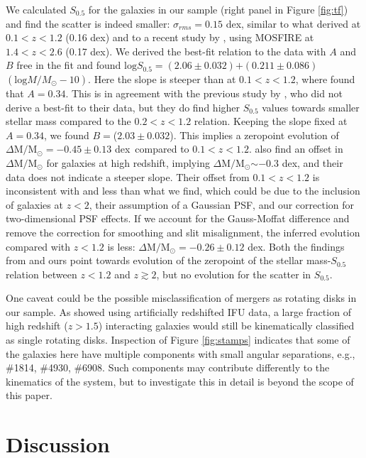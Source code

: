 \documentclass{emulateapj}
\newcommand{\msun}{$\mathrm{M_{\odot}}$}
\newcommand{\bsfree}{$(2.06\pm0.032)$}
\newcommand{\asfree}{$(0.211\pm0.086)$}
\newcommand{\bsfix}{($2.03\pm0.032$)}
\newcommand{\sev}{$\Delta \mathrm{M}/$\msun$=-0.45\pm0.13$ dex}
\newcommand{\sevnoc}{$\Delta \mathrm{M}/$\msun$=-0.26\pm0.12$ dex}
\begin{document}
{We calculated $S_{0.5}$ for the galaxies in our sample (right panel in Figure \ref{fig:tf}) and find the scatter is indeed smaller: {$\sigma_{rms}=0.15$} dex{, similar to what \citet{Kassin07} derived at $0.1<z<1.2$ (0.16 dex) and to a recent study by \citet{Price15}, using MOSFIRE at $1.4<z<2.6$ (0.17 dex)}. We derived the best-fit relation to the data with $A$ and $B$ free in the fit and found $\mathrm{log}S_{0.5}=$\bsfree$+$\asfree$(\mathrm{log}M/M_{\odot}-10)$. Here the slope is steeper than at $0.1<z<1.2$, where \citet{Kassin07} found that $A=0.34$. This is in agreement with the previous study by \citet{Cresci09}, who did not derive a best-fit to their data, but they do find higher $S_{0.5}$ values towards smaller stellar mass compared to the $0.2<z<1.2$ relation. Keeping the slope fixed at $A=0.34$, we found $B=$\bsfix. This implies a zeropoint evolution of \sev\ compared to $0.1<z<1.2$. \citet{Price15} also find an offset {in $\Delta \mathrm{M}/$\msun} for galaxies at high redshift, implying $\Delta \mathrm{M}/$\msun$\sim-0.3$ dex, and their data does not indicate a steeper slope. Their offset from $0.1<z<1.2$ is inconsistent with and less than what we find, which could be due to the inclusion of galaxies at $z<2$, their assumption of a Gaussian PSF, and our correction for two-dimensional PSF effects. If we account for the Gauss-Moffat difference and remove the correction for smoothing {and slit misalignment}, the inferred evolution {compared with} $z<1.2$ is less: \sevnoc. Both the findings from \citet{Price15} and ours point towards evolution of the zeropoint of the stellar mass-$S_{0.5}$ relation between $z<1.2$ and $z\gtrsim2$, but no evolution for the scatter in $S_{0.5}$.

{One caveat could be the possible misclassification of mergers as rotating disks in our sample. As \citet{Hung15} showed using artificially redshifted IFU data, a large fraction of high redshift ($z>1.5$) interacting galaxies would still be kinematically classified as single rotating disks. Inspection of Figure \ref{fig:stamps} indicates that some of the galaxies here have multiple components with small angular separations, e.g., \#1814, \#4930, \#6908. Such components may contribute differently to the kinematics of the system, but to investigate this  in detail is beyond the scope of this paper.}



\section{Discussion}
\label{sec:discussion}

}
\end{document}
